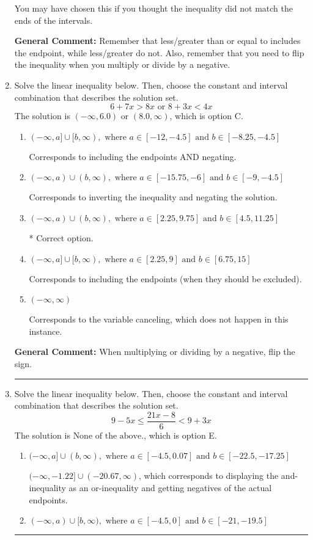 \documentclass{extbook}[14pt]
\newcommand{\litem}[1]{\item #1

\rule{\textwidth}{0.4pt}}
\begin{document}
\begin{enumerate}
{\begin{enumerate}[label=\Alph*.]
You may have chosen this if you thought the inequality did not match the ends of the intervals.
\end{enumerate}

\textbf{General Comment:} Remember that less/greater than or equal to includes the endpoint, while less/greater do not. Also, remember that you need to flip the inequality when you multiply or divide by a negative.
}
\litem{
Solve the linear inequality below. Then, choose the constant and interval combination that describes the solution set.
\[ 6 + 7 x > 8 x \text{ or } 8 + 3 x < 4 x \]The solution is \( (-\infty, 6.0) \text{ or } (8.0, \infty) \), which is option C.\begin{enumerate}[label=\Alph*.]
\item \( (-\infty, a] \cup [b, \infty), \text{ where } a \in [-12, -4.5] \text{ and } b \in [-8.25, -4.5] \)

Corresponds to including the endpoints AND negating.
\item \( (-\infty, a) \cup (b, \infty), \text{ where } a \in [-15.75, -6] \text{ and } b \in [-9, -4.5] \)

Corresponds to inverting the inequality and negating the solution.
\item \( (-\infty, a) \cup (b, \infty), \text{ where } a \in [2.25, 9.75] \text{ and } b \in [4.5, 11.25] \)

 * Correct option.
\item \( (-\infty, a] \cup [b, \infty), \text{ where } a \in [2.25, 9] \text{ and } b \in [6.75, 15] \)

Corresponds to including the endpoints (when they should be excluded).
\item \( (-\infty, \infty) \)

Corresponds to the variable canceling, which does not happen in this instance.
\end{enumerate}

\textbf{General Comment:} When multiplying or dividing by a negative, flip the sign.
}
\litem{
Solve the linear inequality below. Then, choose the constant and interval combination that describes the solution set.
\[ 9 - 5 x \leq \frac{21 x - 8}{6} < 9 + 3 x \]The solution is \( \text{None of the above.} \), which is option E.\begin{enumerate}[label=\Alph*.]
\item \( (-\infty, a] \cup (b, \infty), \text{ where } a \in [-4.5, 0.07] \text{ and } b \in [-22.5, -17.25] \)

$(-\infty, -1.22] \cup (-20.67, \infty)$, which corresponds to displaying the and-inequality as an or-inequality and getting negatives of the actual endpoints.
\item \( (-\infty, a) \cup [b, \infty), \text{ where } a \in [-4.5, 0] \text{ and } b \in [-21, -19.5] \)


\end{enumerate}}
\end{enumerate}
\end{document}
